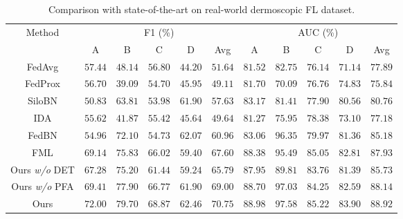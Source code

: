\documentclass[runningheads]{llncs}
\begin{document}
\begin{table}[thb]
\centering
	\caption{Comparison with state-of-the-art on real-world dermoscopic FL dataset.}\label{sota_compare}
\renewcommand\arraystretch{1.0}
\setlength{\tabcolsep}{1.5pt}	
\begin{tabular}{c|cccc|c|cccc|c}
    \toprule[1pt]
    \multirow{2}{*}{Method} & \multicolumn{5}{c|}{F1 (\%)} & \multicolumn{5}{c}{AUC (\%)} \\ \cline{2-11}
            & A  & B  & C  & D & Avg & A    & B    & C    & D   & Avg  \\
            \hline
    FedAvg \cite{fedavg}  &  $57.44$  &  $48.14$  &  $56.80$  & $44.20$  &  $51.64$   &   $81.52$   &   $82.75$   &   $76.14$   &  $71.14$   &   $77.89$      \\
    FedProx \cite{fedprox} &  $56.70$  &  $39.09$  &  $54.70$  & $45.95$  &   $49.11$  &   $81.70$   &   $70.09$   &   $76.76$   &  $74.83$   &   $75.84$      \\
    SiloBN \cite{andreux2020siloed} &  $50.83$  &  $63.81$  &  $53.98$  & $61.90$  &   $57.63$  &   $83.17$   &   $81.41$   &   $77.90$   &   $80.56$  &   $80.76$     \\
    IDA \cite{yeganeh2020inverse}    &  $55.62$  &  $41.87$  &  $55.42$  & $45.64$  &   $49.64$  &   $81.27$   &   $75.95$   &   $78.38$   &  $73.10$   &   $77.18$       \\
    FedBN \cite{li2021fedbn}  &  $54.96$  &  $72.10$  &  $54.73$  &  $62.07$ &  $60.96$   &   $83.06$   &   $96.35$   &   $79.97$   &  $81.36$   &  $85.18$      \\
    FML \cite{federated_mutual}  &  $69.14$  &  $75.83$  &  $66.02$  & $59.40$  &  $67.60$   &   $88.38$   &   $95.49$   &   $85.05$   &   $82.81$  &   $87.93$     \\
    \hline
    Ours \textit{w/o} DET        &  $67.28$  &  $75.20$  &  $61.44$  &  $59.24$ &  $65.79$   &   $87.95$   &   $89.81$   &   $83.76$   &   $81.39$  &   $85.73$   \\
    Ours \textit{w/o} PFA        &  $69.41$  &  $77.90$  &  $66.77$  & $61.90$  &  $69.00$   &   $88.70$   &   $97.03$   &   $84.25$   &  $82.59$   &   $88.14$     \\
    Ours        &  $\bm{72.00}$ &  $\bm{79.70}$  &  $\bm{68.87}$  &  $\bm{62.46}$ &  $\bm{70.75}$   &   $\bm{88.98}$   &   $\bm{97.58}$   &   $\bm{85.22}$   &  $\bm{83.90}$   &   $\bm{88.92}$      \\
    \bottomrule[1pt]
\end{tabular}
\end{table}
\end{document}
